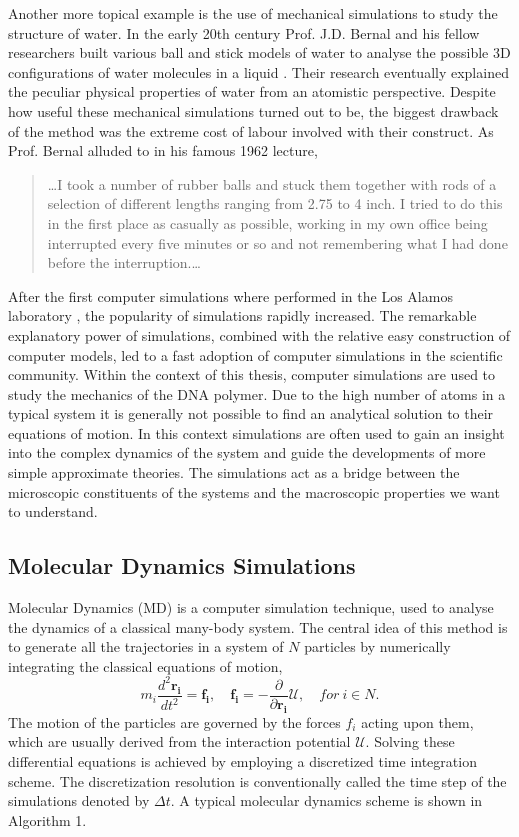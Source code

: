 Another more topical example is the use of mechanical simulations to study the
structure of water.  In the early 20th century Prof. J.D. Bernal and his fellow
researchers built various ball and stick models of water to analyse the possible 3D
configurations of water molecules in a liquid \cite{Finney_2007}. Their research
eventually explained the peculiar physical properties of water from an atomistic
perspective. Despite how useful these mechanical simulations turned out to be, the
biggest drawback of the method was the extreme cost of labour involved with their
construct. As Prof. Bernal alluded to in his famous 1962 lecture,

\begin{quote}
\dots I took a number of rubber balls and stuck them together with rods of a
selection of different lengths ranging from 2.75 to 4 inch. I tried to do this in the
first place as casually as possible, working in my own office being interrupted every
five minutes or so and not remembering what I had done before the interruption.\dots
\cite{Bernal1962}
\end{quote}

After the first computer simulations where performed in the Los Alamos laboratory
\cite{Metropolis1953}, the
popularity of simulations rapidly increased. The remarkable explanatory power of
simulations, combined with the relative easy construction of computer models, led to a
fast adoption of computer simulations in the scientific community. Within the context of
this thesis, computer simulations are used to study the mechanics of
the DNA polymer. Due to the high number of atoms in a typical system it is generally
not possible to find an analytical solution to their equations of motion. In this
context simulations are often used to gain an insight into the complex dynamics of the
system and guide the developments of more simple approximate theories. The simulations
act as a bridge between the microscopic constituents of the systems and the macroscopic
properties we want to understand.

\subsection{Molecular Dynamics Simulations}
Molecular Dynamics (MD) is a computer simulation technique, used to analyse
the dynamics of a classical many-body system. The central idea of this method is to
generate all the trajectories in a system of $N$ particles by numerically
integrating the classical equations of motion,
\[
m_i \frac{d^2 \boldsymbol{r_i}}{dt^2} = \boldsymbol{f_i}, \quad \boldsymbol{f_i} = -
    \frac{\partial}{\partial \boldsymbol{r_i}} \mathcal{U}, \quad for\ i \in N.
\]
The motion of the particles are governed by the forces $f_i$ acting upon them, which are
usually derived from the interaction potential $\mathcal{U}$.
Solving these differential equations is achieved by employing a discretized time
integration scheme. The discretization resolution is conventionally called the time step
of the simulations denoted by $\Delta t$. A typical molecular dynamics scheme is shown in
Algorithm 1.

